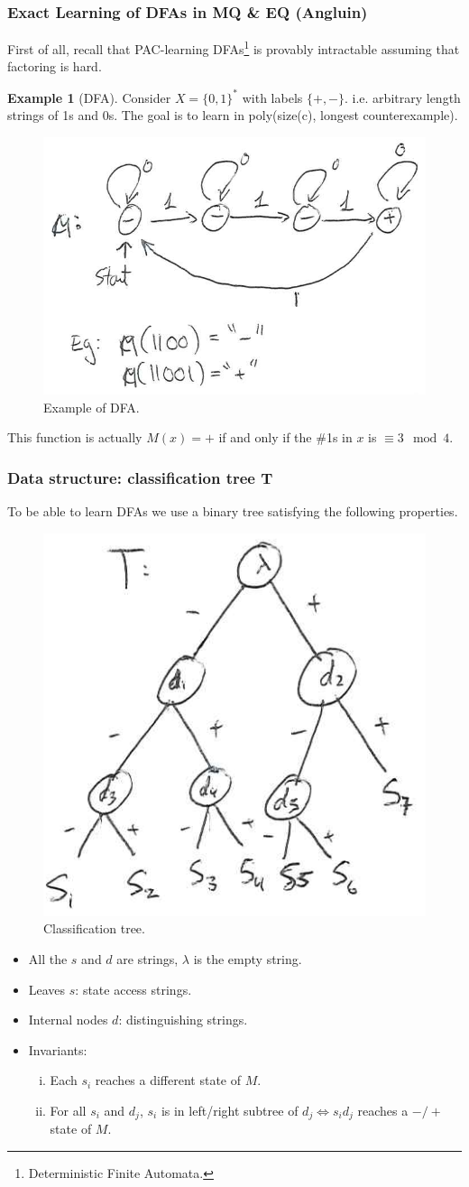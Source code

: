 \documentclass[12pt, letterpaper]{article}
\numberwithin{equation}{section} %
\theoremstyle{definition}
\newtheorem{example}[theorem]{Example}
\theoremstyle{remark}
\begin{document}
\subsubsection{Exact Learning of DFAs in MQ \& EQ (Angluin)}
First of all, recall that PAC-learning DFAs\footnote{Deterministic Finite Automata.}  is provably intractable assuming that factoring is hard.
\begin{example}[DFA]
Consider $X=\lbrace 0, 1\rbrace^*$ with labels $\lbrace +, -\rbrace$. i.e. arbitrary length strings of 1s and 0s. The goal is to learn in poly(size(c), longest counterexample).
\begin{figure}[H]
\centering
\includegraphics[width=0.6\linewidth]{../img/dfa.png}
\caption{Example of DFA.}
\end{figure}
This function is actually $M(x) = +$ if and only if the \#1s in $x$ is $\equiv 3 \mod 4$.
\end{example}

\subsubsection*{Data structure: classification tree T}
To be able to learn DFAs we use a binary tree satisfying the following properties.
\begin{figure}[H]
\centering
\includegraphics[width=0.3\linewidth]{../img/dfa-tree.png}
\caption{Classification tree.}
\end{figure}
\begin{itemize}
\item All the $s$ and $d$ are strings, $\lambda$ is the empty string.
\item Leaves $s$: state access strings.
\item Internal nodes $d$: distinguishing strings.
\item Invariants:
    \begin{enumerate}[i)]
    \item Each $s_i$ reaches a different state of $M$.
    \item For all $s_i$ and $d_j$, $s_i$ is in left/right subtree of $d_j \iff s_id_j$ reaches a $-/+$ state of $M$.
    \end{enumerate}
\end{itemize}
\end{document}
